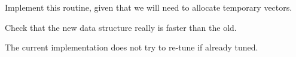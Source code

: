 
\begin{DoxyRefList}
\item[\label{todo__todo000001}%
\hypertarget{todo__todo000001}{}%
Member \hyperlink{poski__TuneMat__common_8c_a5cb1044b9af5b1c9e1a7ca37b7d3fea5}{poski\-\_\-\-Get\-Mat\-Transforms} (const poski\-\_\-matstruct\-\_\-t A\-\_\-tunable)]Implement this routine, given that we will need to allocate temporary vectors. 

Check that the new data structure really is faster than the old. 

The current implementation does not try to re-\/tune if already tuned. 
\end{DoxyRefList}